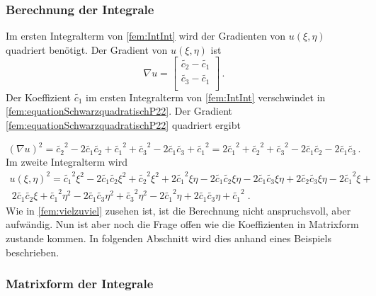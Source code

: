 \subsubsection{Berechnung der Integrale}

Im ersten Integralterm von \eqref{fem:IntInt} wird der Gradienten von $u(\xi, \eta)$  quadriert benötigt. Der Gradient von $u(\xi, \eta)$ ist 
\begin{equation}
	\nabla u = 	
	\left[ \begin{array}{r}
	\tilde{c_2} - \tilde{c_1} \\
	\tilde{c_3} - \tilde{c_1} \\
	\end{array}\right] \, .
	\label{fem:equationSchwarzquadratischP22}
\end{equation} 
Der Koeffizient $\tilde{c_1}$ im ersten Integralterm von \eqref{fem:IntInt} verschwindet in \eqref{fem:equationSchwarzquadratischP22}. Der Gradient \ref{fem:equationSchwarzquadratischP22} quadriert ergibt

\begin{equation}
	(\nabla u)^2 = \tilde{c_2}^2 - 2 \tilde{c_1} \tilde{c_2} + \tilde{c_1}^2 + \tilde{c_3}^2 -2 \tilde{c_1}\tilde{c_3} + \tilde{c_1}^2 = 2\tilde{c_1}^2 + \tilde{c_2}^2 + \tilde{c_3}^2 -2\tilde{c_1}\tilde{c_2} -2\tilde{c_1}\tilde{c_3}\, .
	\label{fem:equationSchwarzquadratischQ2}
\end{equation}
Im zweite Integralterm wird 
\begin{multline}
	u(\xi, \eta)^2 = \tilde{c_1}^2 \xi^2  - 2 \tilde{c_1} \tilde{c_2} \xi^2 + \tilde{c_2}^2 \xi^2 + 2 \tilde{c_1}^2 \xi \eta - 2 \tilde{c_1} \tilde{c_2} \xi \eta - 2 \tilde{c_1} \tilde{c_3} \xi \eta + 2 \tilde{c_2} \tilde{c_3} \xi \eta - 2 \tilde{c_1}^2 \xi + \\\ 2 \tilde{c_1} \tilde{c_2} \xi + \tilde{c_1}^2 \eta^2 - 2 \tilde{c_1} \tilde{c_3} \eta^2 + \tilde{c_3}^2 \eta^2 - 2 \tilde{c_1}^2 \eta + 2 \tilde{c_1} \tilde{c_3} \eta + \tilde{c_1}^2 \; .
	\label{fem:vielzuviel}
\end{multline}
Wie in \eqref{fem:vielzuviel} zusehen ist, ist die Berechnung nicht anspruchsvoll, aber aufwändig. Nun ist aber noch die Frage offen wie die Koeffizienten in Matrixform zustande kommen. In folgenden Abschnitt wird dies anhand eines Beispiels beschrieben.

\subsubsection{Matrixform der Integrale
\label{fem:section:GL}}

